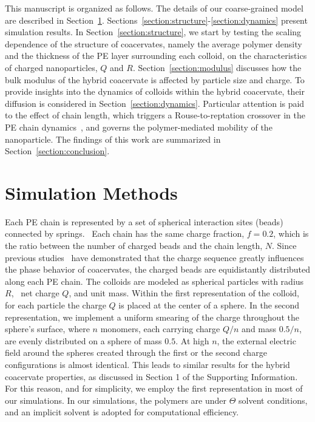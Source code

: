 \documentclass[journal=mamobx, manuscript=article]{achemso}
\begin{document}
This manuscript is organized as follows. The details of our coarse-grained model are described in Section~\ref{section:method}. Sections~\ref{section:structure}-\ref{section:dynamics} present simulation results. In Section~\ref{section:structure}, we start by testing the scaling dependence of the structure of coacervates, namely the average polymer density and the thickness of the PE layer surrounding each colloid, on the characteristics of charged nanoparticles, $Q$ and $R$. Section~\ref{section:modulus} discusses how the bulk modulus of the hybrid coacervate is affected by particle size and charge. To provide insights into the dynamics of colloids within the hybrid coacervate, their diffusion is considered in Section~\ref{section:dynamics}. Particular attention is paid to the effect of chain length, which triggers a Rouse-to-reptation crossover in the PE chain dynamics~\cite{yu2020crossover}, and governs the polymer-mediated mobility of the nanoparticle. The findings of this work are summarized in Section~\ref{section:conclusion}. 




\section{Simulation Methods}
\label{section:method}

Each PE chain is represented by a set of spherical interaction sites (beads) connected by springs.~\cite{kremer1990dynamics} Each chain has the same charge fraction, $f = 0.2$, which is the ratio between the number of charged beads and the chain length, $N$. Since previous studies~\cite{Sing-2017,lytle2019designing,rumyantsev2019controlling} have demonstrated that the charge sequence greatly influences the phase behavior of coacervates, the charged beads are equidistantly distributed along each PE chain. The colloids are modeled as spherical particles with radius $R$,~\cite{Liu2011, Liu2008} net charge $Q$, and unit mass. Within the first representation of the colloid, for each particle the charge $Q$ is placed at the center of a sphere. In the second representation, we implement a uniform smearing of the charge throughout the sphere's surface, where $n$ monomers, each carrying charge $Q/n$ and mass $0.5/n$, are evenly distributed on a sphere of mass $0.5$. At high $n$, the external electric field around the spheres created through the first or the second charge configurations is almost identical. This leads to similar results for the hybrid coacervate properties, as discussed in Section 1 of the Supporting Information. For this reason, and for simplicity, we employ the first representation in most of our simulations. In our simulations, the polymers are under $\Theta$ solvent conditions, and an implicit solvent is adopted for computational efficiency.
\end{document}
